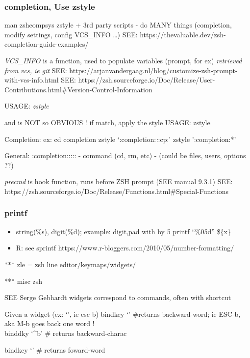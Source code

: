 \documentclass[
  letterpaper,
  DIV=11,
  numbers=noendperiod]{scrartcl}
\begin{document}
\subsubsection{completion, Use zstyle}\label{completion-use-zstyle}

man zshcompsys zstyle + 3rd party scripts - do MANY things (completion,
modify settings, config VCS\_INFO \ldots) SEE:
https://thevaluable.dev/zsh-completion-guide-examples/

\emph{VCS\_INFO} is a function, used to populate variables (prompt, for
ex) \emph{retrieved from vcs, ie git} SEE:
https://arjanvandergaag.nl/blog/customize-zsh-prompt-with-vcs-info.html
SEE:
https://zsh.sourceforge.io/Doc/Release/User-Contributions.html\#Version-Control-Information

USAGE: \emph{zstyle}

and is NOT so OBVIOUS ! if match, apply the style USAGE: zstyle

Completion: ex: cd completion zstyle `:completion:\emph{:}:cp:' zstyle
':completion:*'

General: :completion::::: - command (cd, rm, etc) - (could be files,
users, options ??)

\emph{precmd} is hook function, runs before ZSH prompt (SEE manual
9.3.1) SEE:
https://zsh.sourceforge.io/Doc/Release/Functions.html\#Special-Functions

\subsubsection{printf}\label{printf}

\begin{itemize}
\item
  string(\%s), digit(\%d); example: digit,pad with by 5 printf
  ``\%05d\n'' \$\{x\}
\item
  R: see sprintf https://www.r-bloggers.com/2010/05/number-formatting/
\end{itemize}

*** zle = zsh line editor/keymaps/widgets/

*** misc zsh

SEE Serge Gebhardt widgets correspond to commands, often with shortcut

Given a widget (ex: `\eb', ie esc b) bindkey `\eb' \#returns
backward-word; ie ESC-b, aka M-b goes back one word !\\
binddky `\^{}b' \# returns backward-charac

bindkey `\ef' \# returns foward-word
\end{document}
